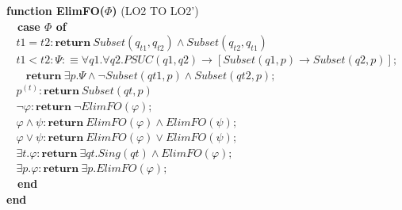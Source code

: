 \documentclass{article}
\begin{document}
\begin{multicols}{4}
\textbf{function ElimFO($\Phi$)} (LO2 TO LO2')\\
\ \ \textbf{case $\Phi$ of} \\
$\ \ \ \ t1 = t2: \textbf{return}\ Subset(q_{t1}, q_{t2}) \wedge Subset(q_{t2}, q_{t1})$ \\
$\ \ \ \ t1 < t2: \Psi :\equiv \forall q1. \forall q2.PSUC(q1, q2) \rightarrow [Subset(q1,p) \rightarrow Subset(q2,p)];$ \\
$\ \ \ \ \ \ \ \ \textbf{return}\ \exists p.\Psi \wedge \neg Subset(qt1, p)\wedge Subset(qt2, p);$ \\
$\ \ \ \ p^{(t)} : \textbf{return}\ Subset(qt, p)$ \\
$\ \ \ \ \neg \varphi : \textbf{return}\ \neg ElimFO(\varphi); $ \\
$\ \ \ \ \varphi \wedge \psi : \textbf{return}\ ElimFO(\varphi) \wedge ElimFO(\psi); $ \\
$\ \ \ \ \varphi \vee \psi : \textbf{return}\ ElimFO(\varphi) \vee ElimFO(\psi); $ \\
$\ \ \ \ \exists t.\varphi : \textbf{return}\ \exists qt.Sing(qt)\wedge ElimFO(\varphi);$ \\
$\ \ \ \ \exists p.\varphi : \textbf{return}\ \exists p.ElimFO(\varphi); $ \\
\ \ \textbf{end} \\
\textbf{end} \\


\end{multicols}
\end{document}

